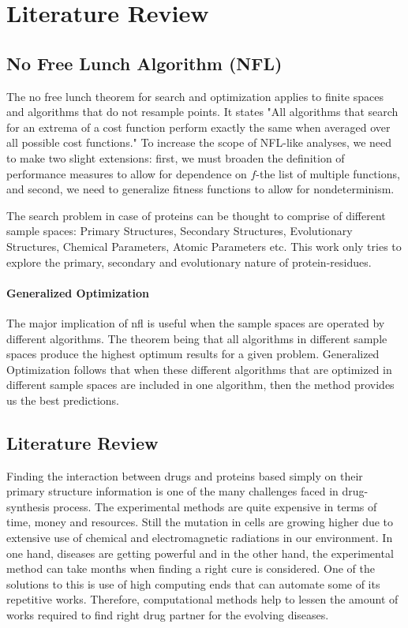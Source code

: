 \chapter{Literature Review}


\section{No Free Lunch Algorithm (NFL)}
The no free lunch theorem for search and optimization applies to finite spaces and algorithms that do not resample points. It states "All algorithms that search for an extrema of a cost function perform exactly the same when averaged over all possible cost functions." To increase the scope of NFL-like analyses, we need to make two slight extensions: first, we must broaden the definition of performance measures to allow for dependence on $f$-the list of multiple functions, and second, we need to generalize fitness functions to allow for nondeterminism. \citep{Wolpert2005}

The search problem in case of proteins can be thought to comprise of different sample spaces: Primary Structures, Secondary Structures, Evolutionary Structures, Chemical Parameters, Atomic Parameters etc. This work only tries to explore the primary, secondary and evolutionary nature of protein-residues.

\subsubsection{Generalized Optimization}

The major implication of \acrshort{nfl} is useful when the sample spaces are operated by different algorithms. The theorem being that all algorithms in different sample spaces produce the highest optimum results for a given problem. Generalized Optimization follows that when these different algorithms that are optimized in different sample spaces are included in one algorithm, then the method provides us the best predictions.


\section{Literature Review}

Finding the interaction between drugs and proteins based simply on their primary structure information is one of the many challenges faced in drug-synthesis process. The experimental methods are quite expensive in terms of time, money and resources. Still the mutation in cells are growing higher due to extensive use of chemical and electromagnetic radiations in our environment. In one hand, diseases are getting powerful and in the other hand, the experimental method can take months when finding a right cure is considered. One of the solutions to this is use of high computing ends that can automate some of its repetitive works. Therefore, computational methods help to lessen the amount of works required to find right drug partner for the evolving diseases.\citep{Leelananda2016}

